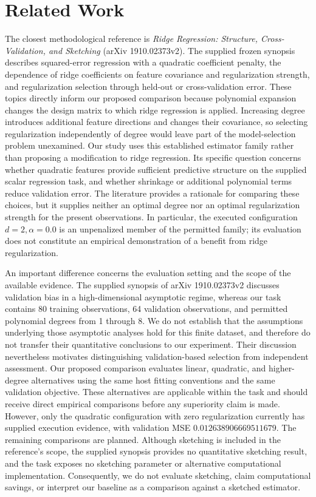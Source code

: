 \documentclass[11pt]{article}
\begin{document}
\section{Related Work}
The closest methodological reference is \textit{Ridge Regression: Structure, Cross-Validation, and Sketching} (arXiv 1910.02373v2). The supplied frozen synopsis describes squared-error regression with a quadratic coefficient penalty, the dependence of ridge coefficients on feature covariance and regularization strength, and regularization selection through held-out or cross-validation error. These topics directly inform our proposed comparison because polynomial expansion changes the design matrix to which ridge regression is applied. Increasing degree introduces additional feature directions and changes their covariance, so selecting regularization independently of degree would leave part of the model-selection problem unexamined. Our study uses this established estimator family rather than proposing a modification to ridge regression. Its specific question concerns whether quadratic features provide sufficient predictive structure on the supplied scalar regression task, and whether shrinkage or additional polynomial terms reduce validation error. The literature provides a rationale for comparing these choices, but it supplies neither an optimal degree nor an optimal regularization strength for the present observations. In particular, the executed configuration \(d=2,\alpha=0.0\) is an unpenalized member of the permitted family; its evaluation does not constitute an empirical demonstration of a benefit from ridge regularization.

An important difference concerns the evaluation setting and the scope of the available evidence. The supplied synopsis of arXiv 1910.02373v2 discusses validation bias in a high-dimensional asymptotic regime, whereas our task contains 80 training observations, 64 validation observations, and permitted polynomial degrees from 1 through 8. We do not establish that the assumptions underlying those asymptotic analyses hold for this finite dataset, and therefore do not transfer their quantitative conclusions to our experiment. Their discussion nevertheless motivates distinguishing validation-based selection from independent assessment. Our proposed comparison evaluates linear, quadratic, and higher-degree alternatives using the same host fitting conventions and the same validation objective. These alternatives are applicable within the task and should receive direct empirical comparisons before any superiority claim is made. However, only the quadratic configuration with zero regularization currently has supplied execution evidence, with validation MSE \(0.012638906669511679\). The remaining comparisons are planned. Although sketching is included in the reference's scope, the supplied synopsis provides no quantitative sketching result, and the task exposes no sketching parameter or alternative computational implementation. Consequently, we do not evaluate sketching, claim computational savings, or interpret our baseline as a comparison against a sketched estimator.
\end{document}
